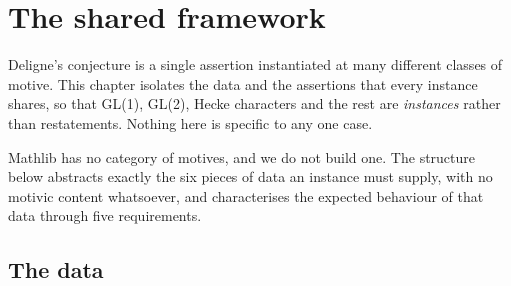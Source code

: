 \chapter{The shared framework}
\label{chap:framework}

Deligne's conjecture is a single assertion instantiated at many different classes of
motive. This chapter isolates the data and the assertions that every instance shares,
so that GL(1), GL(2), Hecke characters and the rest are \emph{instances} rather than
restatements. Nothing here is specific to any one case.

Mathlib has no category of motives, and we do not build one. The structure below
abstracts exactly the six pieces of data an instance must supply, with no motivic
content whatsoever, and characterises the expected behaviour of that data through five
requirements.

\section{The data}

